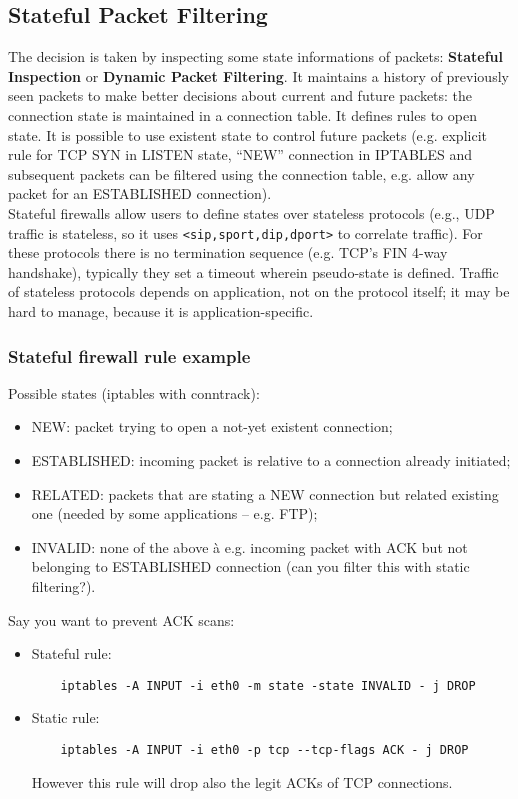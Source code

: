 \documentclass[a4paper, 10pt, titlepage]{article}
\begin{document}
\subsection{Stateful Packet Filtering}
The decision is taken by inspecting some state informations of packets: \textbf{Stateful Inspection} or \textbf{Dynamic Packet Filtering}. It maintains a history of previously seen packets to make better decisions about current and future packets: the connection state is maintained in a connection table. It defines rules to open state. It is possible to use existent state to control future packets (e.g. explicit rule for TCP SYN in LISTEN state, “NEW” connection in IPTABLES and subsequent packets can be filtered using the connection table, e.g. allow any packet for an ESTABLISHED connection). \medskip\\
Stateful firewalls allow users to define states over stateless protocols (e.g., UDP traffic is stateless, so it uses \lstinline|<sip,sport,dip,dport>| to correlate traffic). For these protocols there is no termination sequence (e.g. TCP's FIN 4-way handshake), typically they set a timeout wherein pseudo-state is defined. Traffic of stateless protocols depends on application, not on the protocol itself; it may be hard to manage, because it is application-specific.

\subsubsection*{Stateful firewall rule example}
Possible states (iptables with conntrack):
\begin{itemize}
	\item NEW: packet trying to open a not-yet existent connection;
	\item ESTABLISHED: incoming packet is relative to a connection already initiated;
	\item RELATED: packets that are stating a NEW connection but related existing one (needed by some applications – e.g. FTP);
	\item INVALID: none of the above à e.g. incoming packet with ACK but not belonging to ESTABLISHED connection (can you filter this
	with static filtering?).
\end{itemize}
Say you want to prevent ACK scans:
\begin{itemize}
	\item Stateful rule:
	\begin{lstlisting}
	iptables -A INPUT -i eth0 -m state -state INVALID -	j DROP
	\end{lstlisting}
	\item Static rule:
	\begin{lstlisting}
	iptables -A INPUT -i eth0 -p tcp --tcp-flags ACK - j DROP
	\end{lstlisting}
	However this rule will drop also the legit ACKs of TCP connections.
\end{itemize}
\end{document}
